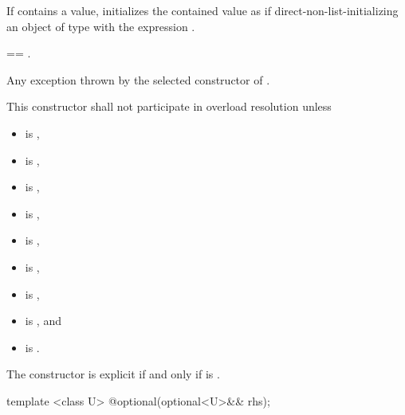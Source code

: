 \begin{itemdescr}
\pnum
\effects
If  contains a value,
initializes the contained value as if direct-non-list-initializing
an object of type  with the expression .

\pnum
\postconditions
{} == .

\pnum
\throws
Any exception thrown by the selected constructor of .

\pnum
\remarks
This constructor shall not participate in overload resolution unless
\begin{itemize}
\item {} is ,
\item {} is ,
\item {} is ,
\item {} is ,
\item {} is ,
\item {} is ,
\item {} is ,
\item {} is , and
\item {} is .
\end{itemize}
The constructor is explicit if and only if
 is .
\end{itemdescr}

%
\begin{itemdecl}
template <class U> @\EXPLICIT@ optional(optional<U>&& rhs);
\end{itemdecl}

